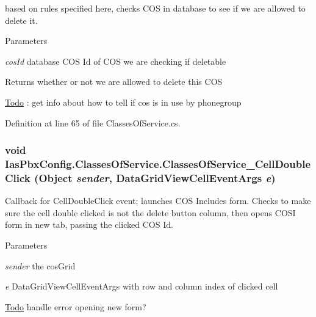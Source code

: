 based on rules specified here, checks COS in database to see if we are allowed to delete it. 
\begin{DoxyParams}{Parameters}
\item[{\em cosId}]database COS Id of COS we are checking if deletable \end{DoxyParams}
\begin{DoxyReturn}{Returns}
whether or not we are allowed to delete this COS 
\end{DoxyReturn}
\begin{Desc}
\item[\hyperlink{todo__todo000001}{Todo}]: get info about how to tell if cos is in use by phonegroup \end{Desc}


Definition at line 65 of file ClassesOfService.cs.\hypertarget{class_ias_pbx_config_1_1_classes_of_service_af8689629d28f48c61a3136122b8fb62d}{
\subsubsection[{ClassesOfService\_\-CellDoubleClick}]{\setlength{\rightskip}{0pt plus 5cm}void IasPbxConfig.ClassesOfService.ClassesOfService\_\-CellDoubleClick (Object {\em sender}, \/  DataGridViewCellEventArgs {\em e})}}
\label{class_ias_pbx_config_1_1_classes_of_service_af8689629d28f48c61a3136122b8fb62d}


Callback for CellDoubleClick event; launches COS Includes form. Checks to make sure the cell double clicked is not the delete button column, then opens COSI form in new tab, passing the clicked COS Id. 
\begin{DoxyParams}{Parameters}
\item[{\em sender}]the cosGrid \item[{\em e}]DataGridViewCellEventArgs with row and column index of clicked cell \end{DoxyParams}
\begin{Desc}
\item[\hyperlink{todo__todo000004}{Todo}]handle error opening new form? \end{Desc}


